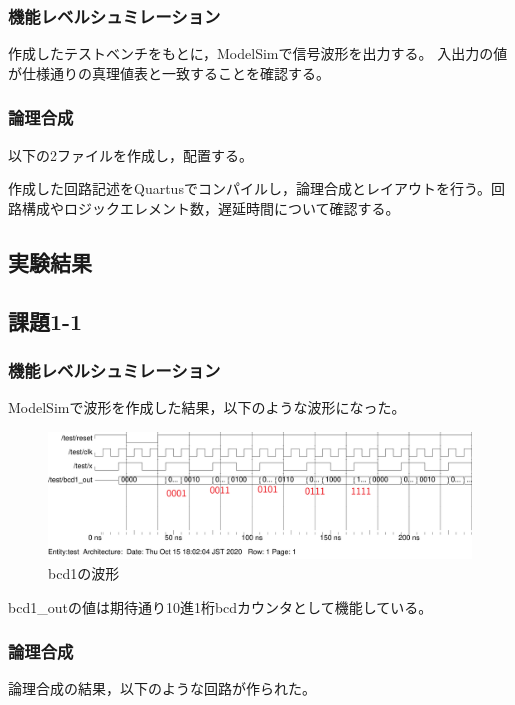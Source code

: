 \subsubsection{機能レベルシュミレーション}
作成したテストベンチをもとに，ModelSimで信号波形を出力する。
入出力の値が仕様通りの真理値表と一致することを確認する。

\subsubsection{論理合成}
以下の2ファイルを作成し，配置する。



作成した回路記述をQuartusでコンパイルし，論理合成とレイアウトを行う。回路構成やロジックエレメント数，遅延時間について確認する。

\subsection{実験結果}
\subsection*{課題1-1}
\subsubsection{機能レベルシュミレーション}
ModelSimで波形を作成した結果，以下のような波形になった。

\begin{figure}[H]
  \centering
  \includegraphics[width=\linewidth]{./src/bcd/bcd1wave.png}
  \caption{bcd1の波形}
\end{figure}

bcd1\_outの値は期待通り10進1桁bcdカウンタとして機能している。

\subsubsection{論理合成}
論理合成の結果，以下のような回路が作られた。

